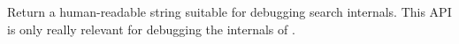 Return a human-readable string suitable for debugging search internals.  This
API is only really relevant for debugging the internals of .

